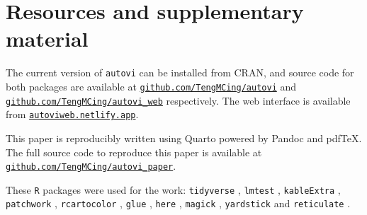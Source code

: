 \documentclass[
doublespace,
  times]{anzsauth}
\begin{document}
\section{Resources and supplementary
material}\label{resources-and-supplementary-material}

The current version of \texttt{autovi} can be installed from CRAN, and
source code for both packages are available at
\href{https://github.com/TengMCing/autovi}{\texttt{github.com/TengMCing/autovi}}
and
\href{https://github.com/TengMCing/autovi_web}{\texttt{github.com/TengMCing/autovi\_web}}
respectively. The web interface is available from
\href{https://autoviweb.netlify.app/}{\texttt{autoviweb.netlify.app}}.

This paper is reproducibly written using Quarto
\citep{Allaire_Quarto_2024} powered by Pandoc \citep{MacFarlane_Pandoc}
and pdfTeX. The full source code to reproduce this paper is available at
\href{https://github.com/TengMCing/autovi_paper}{\texttt{github.com/TengMCing/autovi\_paper}}.

These \texttt{R} packages were used for the work: \texttt{tidyverse}
\citep{tidyverse}, \texttt{lmtest} \citep{lmtest}, \texttt{kableExtra}
\citep{kableextra}, \texttt{patchwork} \citep{patchwork},
\texttt{rcartocolor} \citep{rcartocolor}, \texttt{glue} \citep{glue},
\texttt{here} \citep{here}, \texttt{magick} \citep{magick},
\texttt{yardstick} \citep{yardstick} and \texttt{reticulate}
\citep{reticulate}.


  
\end{document}
